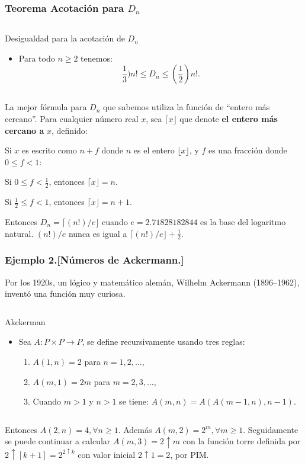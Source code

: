 \begin{frame}
\frametitle{Teorema Acotación para $D_{n}$}
\begin{columns}
 \begin{column}{\textwidth}
\begin{block}{Desigualdad para la acotación de $D_{n}$}
\begin{itemize}
\item Para todo $n \geq 2$ tenemos: \[ \frac{1}{3})n! \leq D_{n} \leq (\frac{1}{2})n!. \]
\end{itemize}
\end{block}
 \end{column}
\end{columns}
La mejor fórmula para $D_{n}$ que sabemos utiliza la función de ``entero más cercano''. Para cualquier número real $x$, sea $\lceil x\rfloor$ que denote \textbf{el entero más cercano a} $x$, definido:

Si $x$ es escrito como $n+f$ donde $n$ es el entero $\lfloor x\rfloor$, y $f$ es una fracción donde $0\leq f< 1$:

Si $0 \leq f < \frac{1}{2}$, entonces $\lceil x \rfloor = n$.

Si $\frac{1}{2}\leq f<1$, entonces $\lceil x \rfloor = n+1$.

Entonces $D_{n}=\lceil(n!)/e\rfloor$ cuando $e=2.71828182844$ es la base del logaritmo natural. $(n!)/e$  nunca es igual a $\lceil(n!)/e\rfloor+\frac{1}{2}.$
\end{frame}

\begin{frame}
\frametitle{Ejemplo 2.[Números de Ackermann.]}
Por los 1920s, un lógico y matemático alemán, Wilhelm Ackermann (1896–1962), inventó una función muy curiosa.
\begin{columns}
\begin{column}{\textwidth}
\begin{block}{Akckerman}
\begin{itemize}
\item Sea $A\colon P\times P\rightarrow P$, se define recursivamente usando tres reglas:
\begin{enumerate}
	\item $A(1,n)=2$ para $n=1,2,\ldots$,
	\item $A(m,1)=2m$ para $m=2,3,\ldots$,
	\item Cuando $m>1$ y $n>1$ se tiene: $A\left(m,n\right)=A\left(A(m-1,n),n-1\right)$.
\end{enumerate}
\end{itemize}
\end{block}
 \end{column}
\end{columns}
Entonces $A(2,n)=4,\forall n\geq 1$. Además $A(m,2)=2^{m},\forall m\geq 1$. Seguidamente se puede continuar a calcular $A\left(m,3\right)=2\uparrow m$ con la función torre definida por $2\uparrow[k+1]=2^{2\uparrow k}$ con valor inicial $2\uparrow 1=2$, por PIM.
\end{frame}